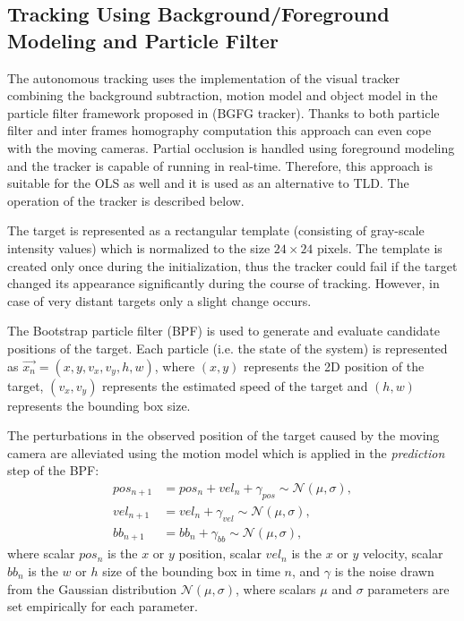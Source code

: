 \subsection{Tracking Using Background/Foreground Modeling and Particle Filter} \label{txt:bgfg_tracker}

The autonomous tracking uses the implementation of the visual tracker combining the background subtraction, motion model and object model in the particle filter framework  proposed in \cite{ObjectTrackinginMonochromaticVideo} (BGFG tracker). Thanks to both particle filter and inter frames homography computation this approach can even cope with the moving cameras. Partial occlusion is handled using foreground modeling and the tracker is capable of running in real-time. Therefore, this approach is suitable for the OLS as well and it is used as an alternative to TLD. The operation of the tracker is described below.

The target is represented as a rectangular template (consisting of gray-scale intensity values) which is normalized to the size $24\times24$ pixels. The template is created only once during the initialization, thus the tracker could fail if the target changed its appearance significantly during the course of tracking. However, in case of very distant targets only a slight change occurs.

The Bootstrap particle filter (BPF) \cite{Isard98condensation} is used to generate and evaluate candidate positions of the target. Each particle (i.e. the state of the system) is represented as $\vec{x_{n}} = (x, y, v_{x}, v_{y}, h, w)$, where $(x, y)$ represents the 2D position of the target, $(v_{x}, v_{y})$ represents the estimated speed of the target and $(h, w)$ represents the bounding box size. 

The perturbations in the observed position of the target caused by the moving camera are alleviated using the motion model which is applied in the \textit{prediction} step of the BPF:
\begin{align}
	pos_{n+1} &= pos_{n} + vel_{n} + \gamma_{pos} \sim \mathcal{N}(\mu, \sigma),\\ \label{eq:bgfg_pos_prediction}
	vel_{n+1} &= vel_{n} + \gamma_{vel} \sim \mathcal{N}(\mu, \sigma),\\
	bb_{n+1} &= bb_{n} + \gamma_{bb} \sim \mathcal{N}(\mu, \sigma),	
\end{align}
where scalar $pos_{n}$ is the $x$ or $y$ position, scalar $vel_{n}$ is the $x$ or $y$ velocity, scalar $bb_{n}$ is the $w$ or $h$ size of the bounding box in time $n$, and $\gamma$ is the noise drawn from the Gaussian distribution $\mathcal{N}(\mu, \sigma)$, where scalars $\mu$ and $\sigma$ parameters are set empirically for each parameter.

